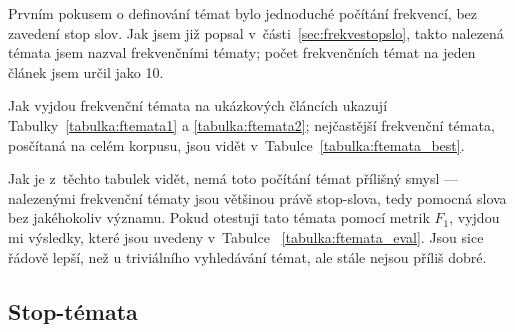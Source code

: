 \documentclass[12pt,a4paper]{report}
\begin{document}

Prvním pokusem o definování témat bylo jednoduché počítání frekvencí, bez zavedení stop slov. Jak jsem již popsal v~části~\ref{sec:frekvestopslo}, takto nalezená témata jsem nazval frekvenčními tématy; počet frekvenčních témat na jeden článek jsem určil jako 10. 

Jak vyjdou frekvenční témata na ukázkových článcích ukazují Tabulky~\ref{tabulka:ftemata1} a \ref{tabulka:ftemata2}; nejčastější frekvenční témata, posčítaná na celém korpusu, jsou vidět v~Ta\-bul\-ce~\ref{tabulka:ftemata_best}. 

Jak je z~těchto tabulek vidět, nemá toto počítání témat přílišný smysl --- nalezenými frekvenční tématy jsou většinou právě stop-slova, tedy pomocná slova bez jakéhokoliv významu. 
Pokud otestuji tato témata pomocí metrik $F_1$, vyjdou mi výsledky, které jsou uvedeny v~Tabulce ~\ref{tabulka:ftemata_eval}. Jsou si\-ce řá\-do\-vě lep\-ší, než u tri\-vi\-á\-lní\-ho vy\-hle\-dá\-vá\-ní témat, ale stále nejsou příliš dobré.



\subsection{Stop-témata}
\label{sec:stemata}


\end{document}
